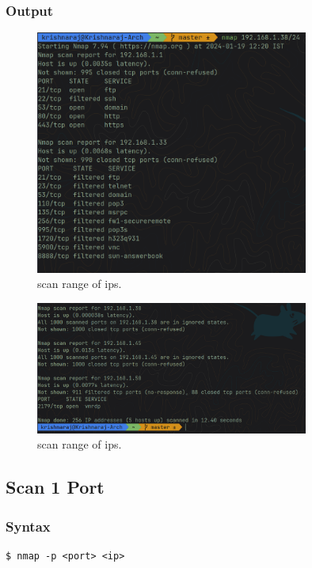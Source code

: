\documentclass[11pt]{article}
\begin{document}
\subsubsection*{Output}
\begin{figure}[H]
    \centering
    \includegraphics[width=0.8\textwidth]{scan ip range 1.png}
    \caption{scan range of ips. }
    \label{fig:1}
\end{figure}
\begin{figure}[H]
    \centering
    \includegraphics[width=0.8\textwidth]{scan ip range 2.png}
    \caption{scan range of ips. }
    \label{fig:1}
\end{figure}

\subsection{Scan 1 Port}

\subsubsection{Syntax}
\begin{verbatim}
$ nmap -p <port> <ip>
\end{verbatim}
\end{document}
